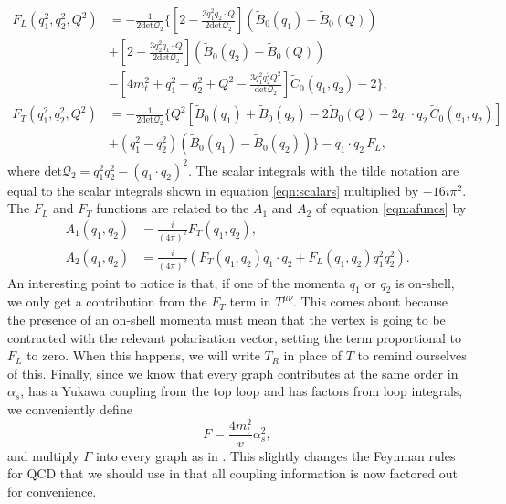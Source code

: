 \begin{equation}
\begin{split}
F_L(q_1^2,q_2^2,Q^2) &= -\frac{1}{2 \text{det} \mathcal{Q}_2} \bigg \{ \left[2-\frac{3 q_1^2 q_2 \cdot Q}{2 \text{det}\mathcal{Q}_2} \right] \left(\tilde{B}_0(q_1)-\tilde{B}_0(Q) \right)\\
&+ \left[2-\frac{3 q_2^2 q_1 \cdot Q}{2 \text{det}\mathcal{Q}_2} \right] \left(\tilde{B}_0(q_2)-\tilde{B}_0(Q) \right) \\
&- \left[4m_t^2 + q_1^2 + q_2^2 + Q^2 - \frac{3 q_1^2 q_2^2 Q^2}{\text{det}\mathcal{Q}_2} \right] \tilde{C}_0(q_1,q_2) - 2 \bigg \}, \\
F_T(q_1^2, q_2^2, Q^2) &= -\frac{1}{2 \text{det} \mathcal{Q}_2} \bigg \{ Q^2 \left[\tilde{B}_0(q_1) + \tilde{B}_0(q_2) - 2\tilde{B}_0(Q) - 2 q_1 \cdot q_2 \hspace{2pt} \tilde{C}_0(q_1,q_2) \right] \\
&+ \left(q_1^2-q_2^2 \right) \left(\tilde{B}_0(q_1) - \tilde{B}_0(q_2)\right) \bigg \} - q_1 \cdot q_2 \hspace{2pt} F_L,
\end{split}
\end{equation}
where $\text{det} \mathcal{Q}_2 =q_1^2q_2^2 - (q_1 \cdot q_2)^2$. The scalar integrals with the tilde notation are equal to the scalar integrals shown in equation \ref{eqn:scalars} multiplied by $-16i\pi^2$. The $F_L$ and $F_T$ functions are related to the $A_1$ and $A_2$ of equation \ref{eqn:afuncs} by
\begin{equation}
\begin{split}
A_1(q_1,q_2) &= \frac{i}{(4 \pi)^2}F_T(q_1,q_2), \\
A_2(q_1,q_2) &= \frac{i}{(4 \pi)^2}\left(F_T(q_1,q_2) q_1 \cdot q_2 + F_L(q_1,q_2)q_1^2q_2^2 \right).
\end{split}
\end{equation} 
An interesting point to notice is that, if one of the momenta $q_1$ or $q_2$ is on-shell, we only get a contribution from the $F_T$ term in $T^{\mu \nu}$. This comes about because the presence of an on-shell momenta must mean that the vertex is going to be contracted with the relevant polarisation vector, setting the term proportional to $F_L$ to zero. When this happens, we will write $T_R$ in place of $T$ to remind ourselves of this. Finally, since we know that every graph contributes at the same order in $\alpha_s$, has a Yukawa coupling from the top loop and has factors from loop integrals, we conveniently define
\begin{equation}
 F = \frac{4 m_t^2}{v} \alpha_s^2, 
\end{equation}
and multiply $F$ into every graph as in \cite{DelDuca2001}. This slightly changes the Feynman rules for QCD that we should use in that all coupling information is now factored out for convenience.

